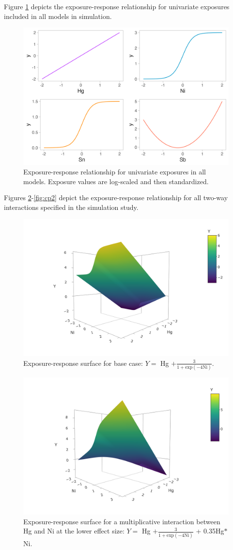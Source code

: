 \documentclass[12pt, twoside]{amherstthesis}
\begin{document}
Figure \ref{fig:univlines} depicts the exposure-response relationship for univariate exposures included in all models in simulation.
\begin{figure}

{\centering \includegraphics[width=0.75\linewidth]{figures/univariatelines} 

}

\caption{Exposure-response relationship for univariate exposures in all models. Exposure values are log-scaled and then standardized.}\label{fig:univlines}
\end{figure}
Figures \ref{fig:basesurf}-\ref{fig:cp2} depict the exposure-response relationship for all two-way interactions specified in the simulation study.
\begin{figure}

{\centering \includegraphics[width=0.5\linewidth]{figures/surfaces/p00} 

}

\caption{Exposure-response surface for base case: $Y=$ Hg $+\frac{3}{1+\textrm{exp}(-4\textrm{Ni})}$.}\label{fig:basesurf}
\end{figure}
\begin{figure}

{\centering \includegraphics[width=0.5\linewidth]{figures/surfaces/am1} 

}

\caption{Exposure-response surface for a multiplicative interaction between Hg and Ni at the lower effect size: $Y=$ Hg $+\frac{3}{1+\textrm{exp}(-4\textrm{Ni})}$ + 0.35Hg$*$Ni.}\label{fig:am1}
\end{figure}
\end{document}
